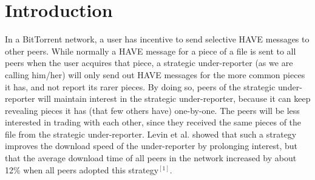 \section{Introduction}

In a BitTorrent network, a user has incentive to send selective HAVE messages to other peers. While normally a HAVE message for a piece of a file is sent to all peers when the user acquires that piece, a strategic under-reporter (as we are calling him/her) will only send out HAVE messages for the more common pieces it has, and not report its rarer pieces. By doing so, peers of the strategic under-reporter will maintain interest in the strategic under-reporter, because it can keep revealing pieces it has (that few others have) one-by-one. The peers will be less interested in trading with each other, since they received the same pieces of the file from the strategic under-reporter. Levin et al. showed that such a strategy improves the download speed of the under-reporter by prolonging interest, but that the average download time of all peers in the network increased by about 12\% when all peers adopted this strategy$^{[1]}$.